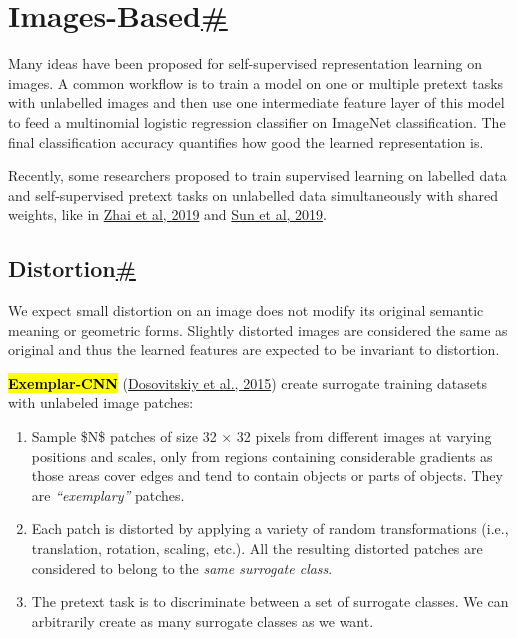 \section{\texorpdfstring{Images-Based\hyperref[images-based]{\#}}{Images-Based\#}}\label{images-based}

Many ideas have been proposed for self-supervised representation learning on images. A common workflow is to train a model on one or multiple pretext tasks with unlabelled images and then use one intermediate feature layer of this model to feed a multinomial logistic regression classifier on ImageNet classification. The final classification accuracy quantifies how good the learned representation is.

Recently, some researchers proposed to train supervised learning on labelled data and self-supervised pretext tasks on unlabelled data simultaneously with shared weights, like in \href{https://arxiv.org/abs/1905.03670}{Zhai et al, 2019} and \href{https://arxiv.org/abs/1909.11825}{Sun et al, 2019}.

\subsection{\texorpdfstring{Distortion\hyperref[distortion]{\#}}{Distortion\#}}\label{distortion}

We expect small distortion on an image does not modify its original semantic meaning or geometric forms. Slightly distorted images are considered the same as original and thus the learned features are expected to be invariant to distortion.

\hl{\textbf{Exemplar-CNN}} (\href{https://arxiv.org/abs/1406.6909}{Dosovitskiy et al., 2015}) create surrogate training datasets with unlabeled image patches:

\begin{enumerate}
\tightlist
\item
  Sample \$N\$ patches of size 32 × 32 pixels from different images at varying positions and scales, only from regions containing considerable gradients as those areas cover edges and tend to contain objects or parts of objects. They are \emph{``exemplary''} patches.
\item
  Each patch is distorted by applying a variety of random transformations (i.e., translation, rotation, scaling, etc.). All the resulting distorted patches are considered to belong to the \emph{same surrogate class}.
\item
  The pretext task is to discriminate between a set of surrogate classes. We can arbitrarily create as many surrogate classes as we want.
\end{enumerate}

